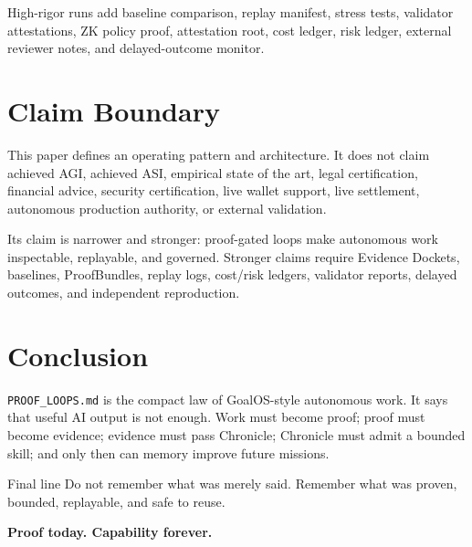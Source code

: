 \documentclass[11pt]{article}
\newcommand{\doccode}[1]{\texttt{#1}}
\begin{document}
High-rigor runs add baseline comparison, replay manifest, stress tests, validator attestations, ZK policy proof, attestation root, cost ledger, risk ledger, external reviewer notes, and delayed-outcome monitor.

\section{Claim Boundary}
This paper defines an operating pattern and architecture. It does not claim achieved AGI, achieved ASI, empirical state of the art, legal certification, financial advice, security certification, live wallet support, live settlement, autonomous production authority, or external validation.

Its claim is narrower and stronger: proof-gated loops make autonomous work inspectable, replayable, and governed. Stronger claims require Evidence Dockets, baselines, ProofBundles, replay logs, cost/risk ledgers, validator reports, delayed outcomes, and independent reproduction.

\section{Conclusion}
\doccode{PROOF\_LOOPS.md} is the compact law of GoalOS-style autonomous work. It says that useful AI output is not enough. Work must become proof; proof must become evidence; evidence must pass Chronicle; Chronicle must admit a bounded skill; and only then can memory improve future missions.

\begin{lawbox}{Final line}
Do not remember what was merely said. Remember what was proven, bounded, replayable, and safe to reuse.
\end{lawbox}

\begin{center}
\Large\bfseries\color{Navy} Proof today. Capability forever.
\end{center}

\newpage
\end{document}
